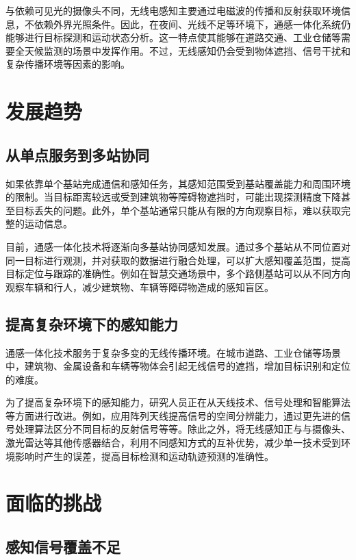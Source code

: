 \documentclass[12pt,a4paper,UTF8,fontset=fandol]{ctexart}
\begin{document}
与依赖可见光的摄像头不同，无线电感知主要通过电磁波的传播和反射获取环境信息，不依赖外界光照条件。因此，在夜间、光线不足等环境下，通感一体化系统仍能够进行目标探测和运动状态分析。这一特点使其能够在道路交通、工业仓储等需要全天候监测的场景中发挥作用。不过，无线感知仍会受到物体遮挡、信号干扰和复杂传播环境等因素的影响。

\section{发展趋势}

\subsection{从单点服务到多站协同}

如果依靠单个基站完成通信和感知任务，其感知范围受到基站覆盖能力和周围环境的限制。当目标距离较远或受到建筑物等障碍物遮挡时，可能出现探测精度下降甚至目标丢失的问题。此外，单个基站通常只能从有限的方向观察目标，难以获取完整的运动信息。

目前，通感一体化技术将逐渐向多基站协同感知发展。通过多个基站从不同位置对同一目标进行观测，并对获取的数据进行融合处理，可以扩大感知覆盖范围，提高目标定位与跟踪的准确性。例如在智慧交通场景中，多个路侧基站可以从不同方向观察车辆和行人，减少建筑物、车辆等障碍物造成的感知盲区。

\subsection{提高复杂环境下的感知能力}

通感一体化技术服务于复杂多变的无线传播环境。在城市道路、工业仓储等场景中，建筑物、金属设备和车辆等物体会引起无线信号的遮挡，增加目标识别和定位的难度。

为了提高复杂环境下的感知能力，研究人员正在从天线技术、信号处理和智能算法等方面进行改进。例如，应用阵列天线提高信号的空间分辨能力，通过更先进的信号处理算法区分不同目标的反射信号等等。除此之外，将无线感知正与与摄像头、激光雷达等其他传感器结合，利用不同感知方式的互补优势，减少单一技术受到环境影响时产生的误差，提高目标检测和运动轨迹预测的准确性。

\section{面临的挑战}

\subsection{感知信号覆盖不足}
\end{document}
